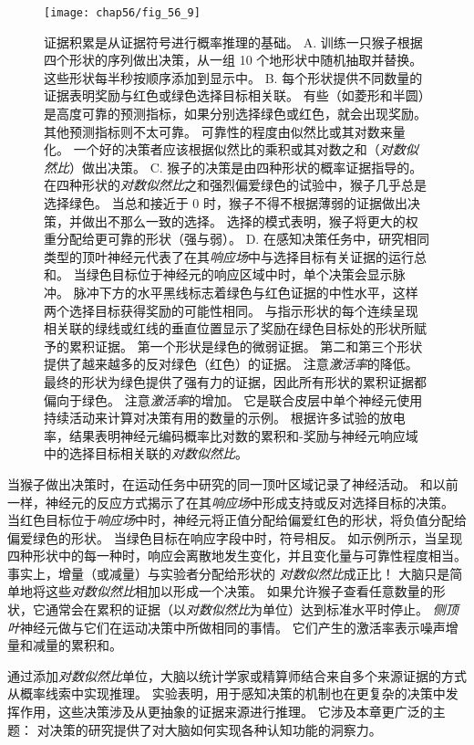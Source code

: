 \begin{figure}[htbp]
	\centering
	\texttt{[image: chap56/fig\_56\_9]}
	\caption{证据积累是从证据符号进行概率推理的基础。
		A. 训练一只猴子根据四个形状的序列做出决策，从一组 10 个地形状中随机抽取并替换。
		这些形状每半秒按顺序添加到显示中。
		B. 每个形状提供不同数量的证据表明奖励与红色或绿色选择目标相关联。
		有些（如菱形和半圆）是高度可靠的预测指标，如果分别选择绿色或红色，就会出现奖励。
		其他预测指标则不太可靠。
		可靠性的程度由似然比或其对数来量化。
		一个好的决策者应该根据似然比的乘积或其对数之和（\textit{对数似然比}）做出决策。
		C. 猴子的决策是由四种形状的概率证据指导的。
		在四种形状的\textit{对数似然比}之和强烈偏爱绿色的试验中，猴子几乎总是选择绿色。
		当总和接近于 0 时，猴子不得不根据薄弱的证据做出决策，并做出不那么一致的选择。
		选择的模式表明，猴子将更大的权重分配给更可靠的形状（强与弱）。
		D. 在感知决策任务中，研究相同类型的顶叶神经元代表了在其\textit{响应场}中与选择目标有关证据的运行总和。
		当绿色目标位于神经元的响应区域中时，单个决策会显示脉冲。
		脉冲下方的水平黑线标志着绿色与红色证据的中性水平，这样两个选择目标获得奖励的可能性相同。
		与指示形状的每个连续呈现相关联的绿线或红线的垂直位置显示了奖励在绿色目标处的形状所赋予的累积证据。
		第一个形状是绿色的微弱证据。
		第二和第三个形状提供了越来越多的反对绿色（红色）的证据。
		注意\textit{激活率}的降低。
		最终的形状为绿色提供了强有力的证据，因此所有形状的累积证据都偏向于绿色。
		注意\textit{激活率}的增加。
		它是联合皮层中单个神经元使用持续活动来计算对决策有用的数量的示例。
		根据许多试验的放电率，结果表明神经元编码概率比对数的累积和-奖励与神经元响应域中的选择目标相关联的\textit{对数似然比}\cite{yang2007probabilistic}。}
	\label{fig:56_9}
\end{figure}


当猴子做出决策时，在运动任务中研究的同一顶叶区域记录了神经活动。
和以前一样，神经元的反应方式揭示了在其\textit{响应场}中形成支持或反对选择目标的决策。
当红色目标位于\textit{响应场}中时，神经元将正值分配给偏爱红色的形状，将负值分配给偏爱绿色的形状。
当绿色目标在响应字段中时，符号相反。
如示例所示，当呈现四种形状中的每一种时，响应会离散地发生变化，并且变化量与可靠性程度相当。
事实上，增量（或减量）与实验者分配给形状的 \textit{对数似然比}成正比！
大脑只是简单地将这些\textit{对数似然比}相加以形成一个决策。
如果允许猴子查看任意数量的形状，它通常会在累积的证据（以\textit{对数似然比}为单位）达到标准水平时停止。
\textit{侧顶叶}神经元做与它们在运动决策中所做相同的事情。
它们产生的激活率表示噪声增量和减量的累积和。


通过添加\textit{对数似然比}单位，大脑以统计学家或精算师结合来自多个来源证据的方式从概率线索中实现推理。
实验表明，用于感知决策的机制也在更复杂的决策中发挥作用，这些决策涉及从更抽象的证据来源进行推理。
它涉及本章更广泛的主题：
对决策的研究提供了对大脑如何实现各种认知功能的洞察力。



